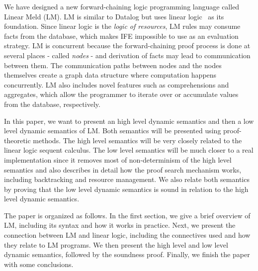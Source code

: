 We have designed a new forward-chaining logic programming language called Linear Meld (LM). LM is similar to Datalog but uses linear logic~\cite{girard-87} as its foundation. Since linear logic is the \emph{logic of resources}, LM rules may consume facts from the database, which makes IFE impossible to use as
an evaluation strategy. LM is concurrent because the forward-chaining proof process is done at several places - called \emph{nodes} -
and derivation of facts may lead to communication between them. The communication paths between nodes and the nodes themselves create
a graph data structure where computation happens concurrently.
LM also includes novel features such as comprehensions and aggregates, which allow the programmer to iterate over
or accumulate values from the database, respectively.

In this paper, we want to present an high level dynamic semantics and then a low level dynamic semantics of LM.
Both semantics will be presented using proof-theoretic methods. The high level semantics will be very closely related to the linear logic sequent calculus.
The low level semantics will be much closer to a real implementation since it removes most of non-determinism of the high level semantics and
also describes in detail how the proof search mechanism works, including backtracking and resource management. We also relate both semantics by
proving that the low level dynamic semantics is sound in relation to the high level dynamic semantics.

The paper is organized as follows. In the first section, we give a brief overview of LM, including its syntax and how it works in practice.
Next, we present the connection between LM and linear logic, including the connectives used and how they relate to LM programs. We then present
the high level and low level dynamic semantics, followed by the soundness proof. Finally, we finish the paper with some conclusions.